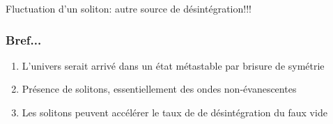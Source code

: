 \documentclass[handout]{beamer}
\begin{document}
\begin{frame}
Fluctuation d'un soliton: autre source de désintégration!!!\\
\end{frame}

\begin{frame}\frametitle{Bref...}
\begin{enumerate}
\item L'univers serait arrivé dans un état métastable par brisure de symétrie
\item Présence de solitons, essentiellement des ondes non-évanescentes
\item Les solitons peuvent accélérer le taux de de désintégration du faux vide
\end{enumerate}

\end{frame}



\end{document}

